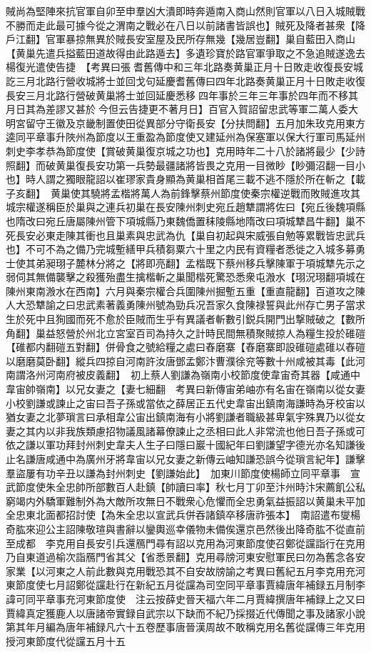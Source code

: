 賊尚為堅陣來抗官軍自卯至申羣凶大潰即時奔遁南入商山然則官軍以八日入城賊戰不勝而走此最可據今從之渭南之戰必在八日以前諸書皆誤也】賊死及降者甚衆【降戶江翻】官軍暴掠無異於賊長安室屋及民所存無幾【幾居豈翻】巢自藍田入商山【黄巢先遣兵搤藍田道故得由此路遁去】多遺珍寶於路官軍爭取之不急追賊遂逸去楊復光遣使告捷　【考異曰張耆舊傳中和三年北路奏黄巢正月十日敗走收復長安城訖三月北路行營收城將士並回戈句延慶耆舊傳曰四年北路奏黄巢正月十日敗走收復長安三月北路行營破黄巢將士並回延慶悉移四年事於三年三年事於四年而不移其月日其為差謬又甚於今但云告捷更不著月日】百官入賀詔留忠武等軍二萬人委大明宮留守王徽及京畿制置使田從異部分守衛長安【分扶問翻】五月加朱玫克用東方逵同平章事升陜州為節度以王重盈為節度使又建延州為保塞軍以保大行軍司馬延州刺史李孝恭為節度使【賞破黄巢復京城之功也】克用時年二十八於諸將最少【少詩照翻】而破黄巢復長安功第一兵勢最疆諸將皆畏之克用一目微眇【眇彌沼翻一目小也】時人謂之獨眼龍詔以崔璆家貴身顯為黄巢相首尾三載不逃不隱於所在斬之【載子亥翻】　黄巢使其驍將孟楷將萬人為前鋒擊蔡州節度使秦宗權逆戰而敗賊進攻其城宗權遂稱臣於巢與之連兵初巢在長安陳州刺史宛丘趙犨謂將佐曰【宛丘後魏項縣也隋改曰宛丘唐屬陳州管下項城縣乃東魏僑置秣陵縣地隋改曰項城犨昌牛翻】巢不死長安必東走陳其衝也且巢素與忠武為仇【巢自初起與宋威張自勉等累戰皆忠武兵也】不可不為之備乃完城塹繕甲兵積芻粟六十里之内民有資糧者悉徙之入城多募勇士使其弟昶珝子麓林分將之【將即亮翻】孟楷既下蔡州移兵擊陳軍于項城犨先示之弱伺其無備襲擊之殺獲殆盡生擒楷斬之巢聞楷死驚恐悉衆屯溵水【珝況珝翻項城在陳州東南溵水在西南】六月與秦宗權合兵圍陳州掘塹五重【重直龍翻】百道攻之陳人大恐犨諭之曰忠武素著義勇陳州號為勁兵况吾家久食陳禄誓與此州存亡男子當求生於死中且狥國而死不愈於臣賊而生乎有異議者斬數引鋭兵開門出撃賊破之【數所角翻】巢益怒營於州北立宮室百司為持久之計時民間無積聚賊掠人為糧生投於碓磑【碓都内翻磑五對翻】併骨食之號給糧之處曰舂磨寨【舂磨寨即設碓磑處碓以舂磑以磨磨莫卧翻】縱兵四掠自河南許汝唐鄧孟鄭汴曹濮徐兖等數十州咸被其毒【此河南謂洛州河南府被皮義翻】　初上蔡人劉謙為嶺南小校節度使韋宙奇其器【咸通中韋宙帥嶺南】以兄女妻之【妻七細翻　考異曰新傳宙弟岫亦有名宙在嶺南以從女妻小校劉謙或諫止之宙曰吾子孫或當依之薛居正五代史韋宙出鎮南海謙時為牙校宙以猶女妻之北夢瑣言曰承相韋公宙出鎮南海有小將劉謙者職級甚卑氣宇殊異乃以從女妻之其内以非我族類慮招物議風諸幕僚諫止之丞相曰此人非常流也他日吾子孫或可依之謙以軍功拜封州刺史韋夫人生子曰隱曰巖十國紀年曰劉謙望字德光亦名知謙後止名謙唐咸通中為廣州牙將韋宙以兄女妻之新傳云岫知謙恐誤今從瑣言紀年】謙擊羣盜屢有功辛丑以謙為封州刺史【劉謙始此】　加東川節度使楊師立同平章事　宣武節度使朱全忠帥所部數百人赴鎮【帥讀曰率】秋七月丁卯至汴州時汴宋薦飢公私窮竭内外驕軍難制外為大敵所攻無日不戰衆心危懼而全忠勇氣益振詔以黄巢未平加全忠東北面都招討使【為朱全忠以宣武兵併吞諸鎮卒移唐祚張本】　南詔遣布燮楊奇肱來迎公主詔陳敬瑄與書辭以鑾輿巡幸儀物未備俟還京邑然後出降奇肱不從直前至成都　李克用自長安引兵還鴈門尋有詔以克用為河東節度使召鄭從讜詣行在克用乃自東道過榆次詣鴈門省其父【省悉景翻】克用尋牓河東安慰軍民曰勿為舊念各安家業【以河東之人前此數與克用戰恐其不自安故牓諭之考異曰舊紀五月李克用充河東節度使七月詔鄭從讜赴行在新紀五月從讜為司空同平章事賈緯唐年補録五月制李諱可同平章事充河東節度使　注云按薛史晉天福六年二月賈緯撰唐年補録上之又曰賈緯真定獲鹿人以唐諸帝實録自武宗以下缺而不紀乃採掇近代傳聞之事及諸家小說第其年月編為唐年補録凡六十五卷歷事唐晉漢周故不敢稱克用名舊從讜傳三年克用授河東節度代從讜五月十五